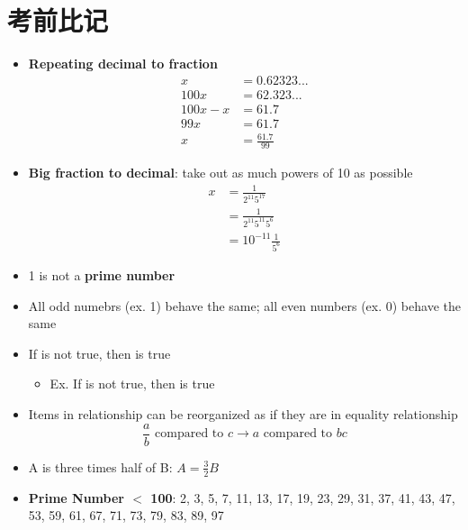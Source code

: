 \appendix
\chapter{考前比记}

\begin{multicols}{2}
  \begin{itemize}
    \item \textbf{Repeating decimal to fraction}
    \begin{align*}
      x &= 0.62323... \\
      100x &= 62.323... \\
      100x - x &= 61.7 \\
      99x &= 61.7 \\
      x &= \frac{61.7}{99}
    \end{align*}

    \item \textbf{Big fraction to decimal}: take out as much powers of 10 as
    possible
    \begin{align*}
      x &= \frac{1}{2^{11} 5^{17}} \\
      &= \frac{1}{2^{11} 5^{11} 5^{6}} \\
      &= 10^{-11} \frac{1}{5^{6}}
    \end{align*}

    \item 1 is not a \textbf{prime number}
    \item All odd numebrs (ex. 1) behave the same; all even numbers
    (ex. 0) behave the same
    \item If  is not true, then 
    is true
    \begin{itemize}
      \item Ex. If  is not true, then
       is true
    \end{itemize}

    \item Items in  relationship can be reorganized as if they
    are in equality relationship
    \begin{equation}
      \frac{a}{b} \text{ compared to } c \to a \text{ compared to } bc
    \end{equation}

    \item A is three times half of B: $ A = \frac{3}{2} B $
    \item \textbf{Prime Number $ < $ 100}: 2, 3, 5, 7, 11, 13, 17, 19, 23, 29,
    31, 37, 41, 43, 47, 53, 59, 61, 67, 71, 73, 79, 83, 89, 97


\end{itemize}
\end{multicols}
